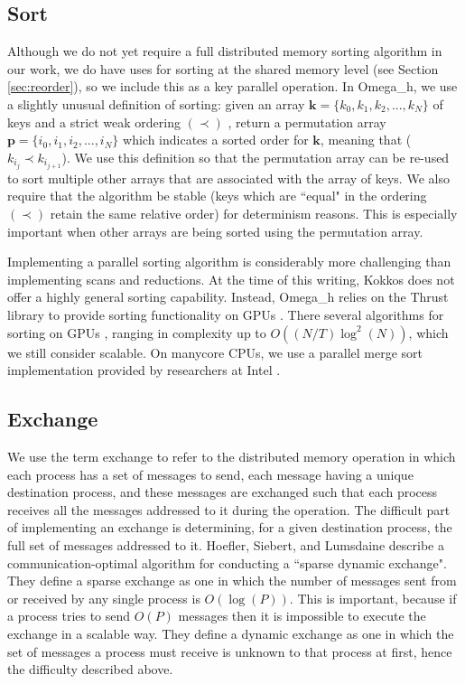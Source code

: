 \subsection{Sort}
\label{sec:sort}

Although we do not yet require a full distributed memory sorting algorithm
in our work, we do have uses for sorting at the shared memory level
(see Section \ref{sec:reorder}), so we include this as a key parallel operation.
In Omega\_h, we use a slightly unusual definition of sorting:
given an array $\mathbf{k}=\{k_0,k_1,k_2,...,k_N\}$ of keys and
a strict weak ordering $(\prec)$ \cite{roberts2009applied},
return a permutation array
$\mathbf{p}=\{i_0,i_1,i_2,...,i_N\}$ which indicates
a sorted order for $\mathbf{k}$, meaning that ($k_{i_j} \prec k_{i_{j+1}}$).
We use this definition so that the permutation array can be re-used
to sort multiple other arrays that are associated with the array of keys.
We also require that the algorithm be stable (keys which are ``equal"
in the ordering $(\prec)$ retain the same relative order) for
determinism reasons.
This is especially important when other arrays are being sorted
using the permutation array.

Implementing a parallel sorting algorithm is considerably more
challenging than implementing scans and reductions.
At the time of this writing, Kokkos does not offer a highly general
sorting capability.
Instead, Omega\_h relies on the Thrust library to provide sorting functionality
on GPUs \cite{bell2011thrust}.
There several algorithms for sorting on GPUs \cite{satish2009designing},
ranging in complexity up to $O((N/T)\log^2(N))$, which we still consider
scalable.
On manycore CPUs, we use a parallel merge sort implementation provided
by researchers at Intel \cite{robinson2014parallel}.

\subsection{Exchange}
\label{sec:exch}

We use the term exchange to refer to the distributed memory operation
in which each process has a set of messages to send, each message
having a unique destination process, and these messages are exchanged
such that each process receives all the messages addressed to it
during the operation.
The difficult part of implementing an exchange is determining, for
a given destination process, the full set of messages addressed to it.
Hoefler, Siebert, and Lumsdaine \cite{hoefler2010scalable} describe
a communication-optimal algorithm for conducting a ``sparse dynamic exchange".
They define a sparse exchange as one in which the number of messages
sent from or received by any single process is $O(\log(P))$.
This is important, because if a process tries to send $O(P)$ messages
then it is impossible to execute the exchange in a scalable way.
They define a dynamic exchange as one in which the set of messages
a process must receive is unknown to that process at first, hence
the difficulty described above.

